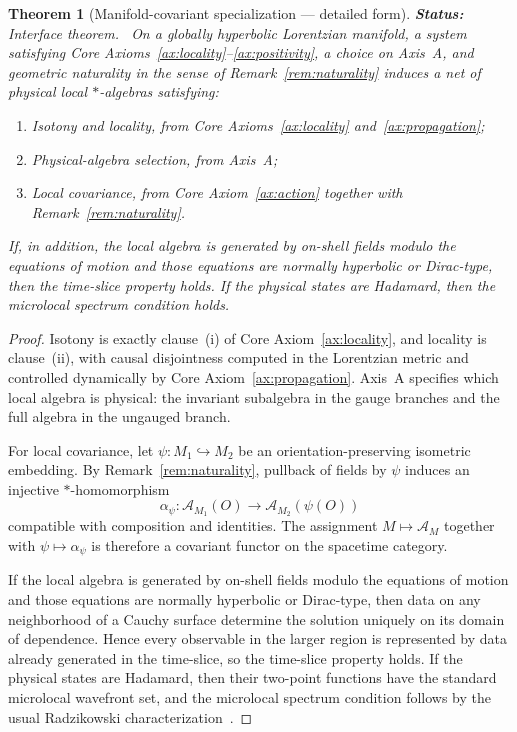 \documentclass[12pt,a4paper]{article}
\theoremstyle{plain}
\newtheorem{theorem}{Theorem}[section]
\theoremstyle{definition}
\theoremstyle{remark}
\newcommand{\alg}{\mathcal{A}}
\newcommand{\status}[1]{\textnormal{\textbf{Status:} #1.}\ }
\begin{document}
\begin{theorem}[Manifold-covariant specialization --- detailed form]
  \label{thm:manifold-detail}
  \status{Interface theorem}
  On a globally hyperbolic Lorentzian manifold, a system satisfying
  Core Axioms~\ref{ax:locality}--\ref{ax:positivity}, a choice on
  Axis~A, and geometric naturality in the sense of
  Remark~\ref{rem:naturality} induces a net of physical local
  $*$-algebras satisfying:
  \begin{enumerate}[nosep,label=(\alph*)]
  \item Isotony and locality, from Core Axioms~\ref{ax:locality}
    and~\ref{ax:propagation};
  \item Physical-algebra selection, from Axis~A;
  \item Local covariance, from Core Axiom~\ref{ax:action} together
    with Remark~\ref{rem:naturality}.
  \end{enumerate}
  If, in addition, the local algebra is generated by on-shell fields
  modulo the equations of motion and those equations are normally
  hyperbolic or Dirac-type, then the time-slice property holds. If the
  physical states are Hadamard, then the microlocal spectrum condition
  holds.
\end{theorem}

\begin{proof}
  Isotony is exactly clause~(i) of Core Axiom~\ref{ax:locality}, and
  locality is clause~(ii), with causal disjointness computed in the
  Lorentzian metric and controlled dynamically by Core
  Axiom~\ref{ax:propagation}. Axis~A specifies which local algebra is
  physical: the invariant subalgebra in the gauge branches and the
  full algebra in the ungauged branch.

  For local covariance, let $\psi: M_1 \hookrightarrow M_2$ be an
  orientation-preserving isometric embedding. By
  Remark~\ref{rem:naturality}, pullback of fields by $\psi$ induces an
  injective $*$-homomorphism
  \[
    \alpha_\psi: \alg_{M_1}(O) \to \alg_{M_2}(\psi(O))
  \]
  compatible with composition and identities. The assignment
  $M \mapsto \alg_M$ together with $\psi \mapsto \alpha_\psi$ is
  therefore a covariant functor on the spacetime category.

  If the local algebra is generated by on-shell fields modulo the
  equations of motion and those equations are normally hyperbolic or
  Dirac-type, then data on any neighborhood of a Cauchy surface
  determine the solution uniquely on its domain of dependence. Hence
  every observable in the larger region is represented by data already
  generated in the time-slice, so the time-slice property holds. If
  the physical states are Hadamard, then their two-point functions have
  the standard microlocal wavefront set, and the microlocal spectrum
  condition follows by the usual Radzikowski
  characterization~\cite{Radzikowski}.
\end{proof}
\end{document}

